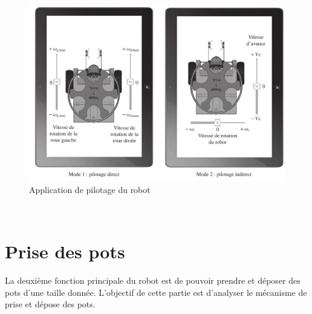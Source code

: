 \begin{figure}[ht!]
\begin{center}
 \includegraphics[width=0.7\linewidth]{img/fig09}
\end{center}
\caption{Application de pilotage du robot}
\label{fig09}
\end{figure}


~\



\section{Prise des pots}

La deuxième fonction principale du robot est de pouvoir prendre et déposer des pots d'une taille donnée. L'objectif de cette partie est d'analyser le mécanisme de prise et dépose des pots.

